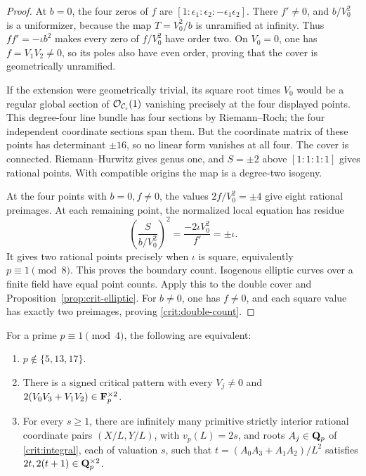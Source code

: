 \begin{proof}
At \(b=0\), the four zeros of \(f\) are
\([1:\epsilon_1:\epsilon_2:-\epsilon_1\epsilon_2]\).
There \(f'\ne0\), and \(b/V_0^2\) is a uniformizer, because the
map \(T=V_0^2/b\) is unramified at infinity. Thus \(ff'=-\iota b^2\)
makes every zero of \(f/V_0^2\) have order two. On \(V_0=0\), one has \(f=V_1V_2\ne0\), so its poles
also have even order, proving that the cover is
geometrically unramified.

If the extension were geometrically trivial, its square root times
\(V_0\) would be a regular global section of \(\mathcal O_{\mathcal C_\iota}(1)\)
vanishing precisely at the four displayed points. This degree-four
line bundle has four sections by Riemann--Roch; the four independent
coordinate sections span them. But the coordinate matrix of these
points has determinant \(\pm16\), so no linear form vanishes at all
four. The cover is connected. Riemann--Hurwitz gives genus one, and
\(S=\pm2\) above \([1:1:1:1]\) gives rational points.
With compatible origins the map is a degree-two isogeny.

At the four points with \(b=0,f\ne0\), the values
\(2f/V_0^2=\pm4\) give eight rational preimages. At each remaining
point, the normalized local equation has residue
\[
 \left(\frac{S}{b/V_0^2}\right)^2
 =\frac{-2\iota V_0^2}{f'}=\pm\iota.
\]
It gives two rational points precisely when \(\iota\) is square,
equivalently \(p\equiv1\pmod8\). This proves the boundary count.
Isogenous elliptic curves over a finite field have equal point
counts. Apply this to the double cover and
Proposition~\ref{prop:crit-elliptic}. For \(b\ne0\), one has
\(f\ne0\), and each square value has exactly two preimages, proving
\eqref{crit:double-count}.
\end{proof}

\begin{theorem}\label{thm:crit-refined}
For a prime \(p\equiv1\pmod4\), the following are equivalent:
\begin{enumerate}
\item \(p\notin\{5,13,17\}\).
\item There is a signed critical pattern with every \(V_j\ne0\)
      and \(2(V_0V_3+V_1V_2)\in\mathbf F_p^{\times2}\).
\item For every \(s\ge1\), there are infinitely many primitive
      strictly interior rational coordinate pairs \((X/L,Y/L)\),
      with \(v_p(L)=2s\), and roots \(A_j\in\mathbf Q_p\) of
      \eqref{crit:integral}, each of valuation \(s\), such that
      \(t=(A_0A_3+A_1A_2)/L^2\) satisfies
      \(2t,2(t+1)\in\mathbf Q_p^{\times2}\).
\end{enumerate}
\end{theorem}

